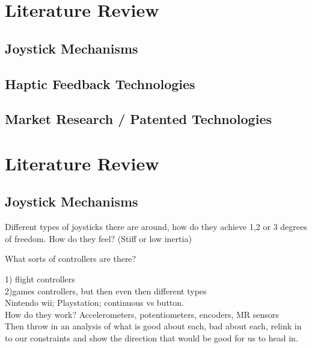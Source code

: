 \section{Literature Review}
\label{sec:literature_review}

\subsection{Joystick Mechanisms}
\label{sub:joystick_mechanisms}


\subsection{Haptic Feedback Technologies}
\label{sub:haptic_feedback_technologies}


\subsection{Market Research / Patented Technologies}
\label{sub:market_research_patented_technologies}


\section{Literature Review}
\label{sec:literature_review}

\subsection{Joystick Mechanisms}
\label{sub:joystick_mechanisms}
Different types of joysticks there are around, how do they achieve 1,2 or 3 degrees of freedom. How do they feel? (Stiff or low inertia)

What sorts of controllers are there?

1) flight controllers\\
2)games controllers, but then even then different types\\
    Nintendo wii; Playstation; continuous vs button.\\
    How do they work? Accelerometers, potentiometers, encoders, MR sensors\\


Then throw in an analysis of what is good about each, bad about each, relink in to our constraints and show the direction that would be good for us to head in.

